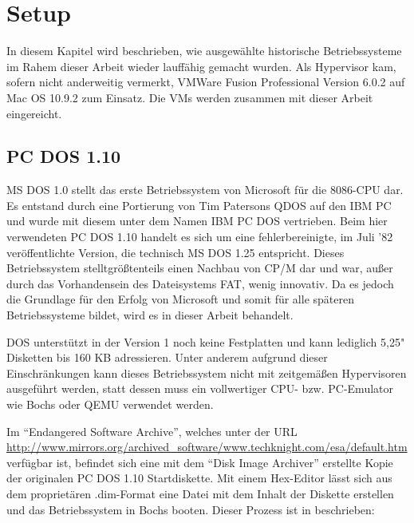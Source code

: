 \chapter{Setup}
\label{chap:setup}

	In diesem Kapitel wird beschrieben, wie ausgewählte historische Betriebssysteme im Rahem dieser Arbeit wieder lauffähig gemacht wurden. Als Hypervisor kam, sofern nicht anderweitig vermerkt, VMWare Fusion Professional Version 6.0.2 auf Mac OS 10.9.2 zum Einsatz. 
	Die VMs werden zusammen mit dieser Arbeit eingereicht.

\section{PC DOS 1.10}

	MS DOS 1.0 stellt das erste Betriebssystem von Microsoft für die 8086-CPU dar. Es entstand durch eine Portierung von Tim Patersons QDOS auf den IBM PC und wurde mit diesem unter dem Namen IBM PC DOS vertrieben. \cite{WinHistory}
	Beim hier verwendeten PC DOS 1.10 handelt es sich um eine fehlerbereinigte, im Juli '82 veröffentlichte Version, die technisch MS DOS 1.25 entspricht. 
	Dieses Betriebssystem stelltgrößtenteils einen Nachbau von CP/M dar und war, außer durch das Vorhandensein des Dateisystems \gls{FAT}, wenig innovativ.
	Da es jedoch die Grundlage für den Erfolg von Microsoft und somit für alle späteren Betriebssysteme bildet, wird es in dieser Arbeit behandelt.

	DOS unterstützt in der Version 1 noch keine Festplatten und kann lediglich 5,25" Disketten bis 160 KB adressieren. \cite{WinHistory}
	Unter anderem aufgrund dieser Einschränkungen kann dieses Betriebssystem nicht mit zeitgemäßen Hypervisoren ausgeführt werden, statt dessen muss ein vollwertiger CPU- bzw. PC-Emulator wie Bochs oder QEMU verwendet werden. 

	Im "`Endangered Software Archive"', welches unter der URL \url{http://www.mirrors.org/archived_software/www.techknight.com/esa/default.htm} verfügbar ist, befindet sich eine mit dem "`Disk Image Archiver"' erstellte Kopie der originalen PC DOS 1.10 Startdiskette. 
	Mit einem Hex-Editor lässt sich aus dem proprietären .dim-Format eine Datei mit dem Inhalt der Diskette erstellen und das Betriebssystem in Bochs booten.
	Dieser Prozess ist in \cite{PCMinistry} beschrieben:

